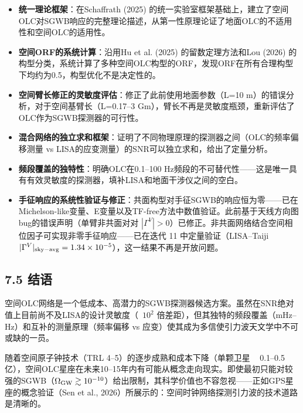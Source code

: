 \documentclass[12pt,a4paper]{article}
\begin{document}
\begin{itemize}
  \item[1] \textbf{统一理论框架}：在Schaffrath (2025) 的统一实验室框架基础上，建立了空间OLC对SGWB响应的完整理论描述，从第一性原理论证了地面OLC的不适用性和空间OLC的适用性。

  \item[2] \textbf{空间ORF的系统计算}：沿用Hu et al. (2025) 的留数定理方法和Lou (2026) 的构型分类，系统计算了多种空间OLC构型的ORF，发现ORF在所有合理构型下均约为0.5，构型优化不是决定性的。

  \item[3] \textbf{空间臂长修正的灵敏度评估}：修正了此前使用地面参数（L=10 m）的错误分析，对于空间基臂长（L=0.17–3 Gm），臂长不再是灵敏度瓶颈，重新评估了OLC作为SGWB探测器的可行性。

  \item[4] \textbf{混合网络的独立求和框架}：证明了不同物理原理的探测器之间（OLC的频率偏移测量 vs LISA的应变测量）的SNR可以独立求和，给出了定量分析。

  \item[5] \textbf{频段覆盖的独特性}：明确OLC在0.1–100 Hz频段的不可替代性——这是唯一具有有效灵敏度的探测器，填补LISA和地面干涉仪之间的空白。

  \item[6] \textbf{手征响应的系统性验证与修正}：共面构型对手征SGWB的响应恒为零——已在Michelson-like变量、E变量以及TF-free方法中数值验证。此前基于天线方向图bug的错误声明（单臂非共面对对 $|\Gamma^V|>0$）已修正。非共面网络结合空间相位因子可实现非零手征响应——已在迭代 11 中定量验证（LISA--Taiji $|\Gamma^V|_{\rm sky-avg} = 1.34 \times 10^{-5}$），这一结果不再是开放问题。

\end{itemize}
\subsection{7.5 结语}


空间OLC网络是一个低成本、高潜力的SGWB探测器候选方案。虽然在SNR绝对值上目前尚不及LISA的设计灵敏度（~$10^2$ 倍差距），但其独特的频段覆盖（mHz–Hz）和互补的测量原理（频率偏移 vs 应变）使其成为多信使引力波天文学中不可或缺的一员。

随着空间原子钟技术（TRL 4–5）的逐步成熟和成本下降（单颗卫星 ~ 0.1–0.5亿），空间OLC星座在未来10–15年内有可能从概念走向现实。即使最初只能对较强的SGWB（$\Omega_{\rm GW} \gtrsim 10^{-10}$）给出限制，其科学价值也不容忽视——正如GPS星座的概念验证（Sen et al., 2026）所展示的：空间时钟网络探测引力波的技术道路是清晰的。
\end{document}
